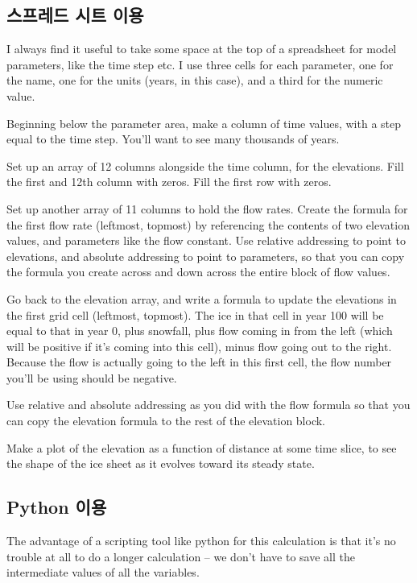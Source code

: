 {\subsection{스프레드 시트 이용}\index{}

I always find it useful to take some space at the top of a spreadsheet for model parameters, like the time step etc. I use three cells for each parameter, one for the name, one for the units (years, in this case), and a third for the numeric value.

Beginning below the parameter area, make a column of time values, with a step equal to the time step. You'll want to see many thousands of years.

Set up an array of 12 columns alongside the time column, for the elevations. Fill the first and 12th column with zeros. Fill the first row with zeros.

Set up another array of 11 columns to hold the flow rates. Create the formula for the first flow rate (leftmost, topmost) by referencing the contents of two elevation values, and parameters like the flow constant. Use relative addressing to point to elevations, and absolute addressing to point to parameters, so that you can copy the formula you create across and down across the entire block of flow values.

Go back to the elevation array, and write a formula to update the elevations in the first grid cell (leftmost, topmost). The ice in that cell in year 100 will be equal to that in year 0, plus snowfall, plus flow coming in from the left (which will be positive if it's coming into this cell), minus flow going out to the right. Because the flow is actually going to the left in this first cell, the flow number you'll be using should be negative.

Use relative and absolute addressing as you did with the flow formula so that you can copy the elevation formula to the rest of the elevation block.

Make a plot of the elevation as a function of distance at some time slice, to see the shape of the ice sheet as it evolves toward its steady state.


\subsection{Python 이용}\index{}

The advantage of a scripting tool like python for this calculation is that it's no trouble at all to do a longer calculation -- we don't have to save all the intermediate values of all the variables.

}
